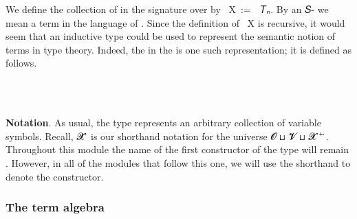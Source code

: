 We define the collection of  in the signature  over  by
~\ab X~:=~~\ab 𝑇ₙ. By an 𝑆- we mean a term in the language of
. Since the definition of ~\ab X is recursive, it would seem that
an inductive type could be used to represent the semantic notion of terms in
type theory. Indeed, the  in the \ualib is
one such representation; it is defined as follows.
\ccpad
\begin{code}%
\>[0]\AgdaSpace{}%
\AgdaSpace{}%
\AgdaSymbol{\{}\AgdaSpace{}%
\AgdaSymbol{:}\AgdaSpace{}%
\AgdaSymbol{\}(}\AgdaSpace{}%
\AgdaSymbol{:}\AgdaSpace{}%
\AgdaSpace{}%
\AgdaSpace{}%
\AgdaSymbol{)}\AgdaSpace{}%
\AgdaSymbol{:}\AgdaSpace{}%
\AgdaSpace{}%
\AgdaSpace{}%
%
\>[45]\<%
\\
\>[0][@{}l@{\AgdaIndent{0}}]%
\>[2]\AgdaSpace{}%
\AgdaSymbol{:}\AgdaSpace{}%
\AgdaSpace{}%
\AgdaSpace{}%
\AgdaSpace{}%
\<%
\\
%
\>[2]\AgdaSpace{}%
\AgdaSymbol{:}\AgdaSpace{}%
\AgdaSymbol{(}\AgdaSpace{}%
\AgdaSymbol{:}\AgdaSpace{}%
\AgdaSpace{}%
\AgdaSpace{}%
\AgdaSymbol{)(}\AgdaSpace{}%
\AgdaSymbol{:}\AgdaSpace{}%
\AgdaSpace{}%
\AgdaSpace{}%
\AgdaSpace{}%
\AgdaSpace{}%
\AgdaSpace{}%
\AgdaSpace{}%
\AgdaSymbol{)}\AgdaSpace{}%
\AgdaSpace{}%
\AgdaSpace{}%
\<%
\end{code}
\ccpad
\textbf{Notation}. As usual, the type  represents an arbitrary collection
of variable symbols. Recall,  \ab 𝓧 \af ̇ is our shorthand notation for
the universe \ab 𝓞 \af ⊔ \ab 𝓥 \af ⊔ \ab 𝓧 \af ⁺ \af ̇.   Throughout this module
the name of the first constructor of the  type will remain
. However, in all of the modules that follow this one, we will
use the shorthand  to denote the  constructor. 


\subsubsection{The term algebra}\label{the-term-algebra}


